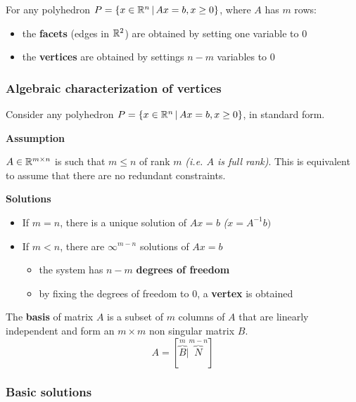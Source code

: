 \documentclass[english]{article}
\begin{document}
\bigskip
\begin{property}
  For any polyhedron \(P = \left\{ x \in \mathbb{R}^n \, | \, Ax = b, x \geq 0 \right\}\), where \(A\) has \(m\) rows:

  \begin{itemize}
    \item the \textbf{facets} (edges in \(\mathbb{R}^2\)) are obtained by setting one variable to \(0\)
    \item the \textbf{vertices} are obtained by settings \(n-m\) variables to \(0\)
  \end{itemize}
\end{property}

\subsubsection{Algebraic characterization of vertices}

Consider any polyhedron \(P = \left\{ x \in \mathbb{R}^n \, | \, Ax = b, x \geq 0 \right\}\), in standard form.

\bigskip
\textbf{Assumption}

\(A \in \mathbb{R}^{m \times n}\) is such that \(m \leq n\) of rank \(m\) \textit{(i.e. \(A\) is full rank)}.
This is equivalent to assume that there are no redundant constraints.

\bigskip
\textbf{Solutions}

\begin{itemize}
  \item If \(m = n\), there is a unique solution of \(Ax = b\) \textit{(\(x = A^{-1} b)\)}
  \item If \(m < n\), there are \(\infty^{m-n}\) solutions of \(Ax = b\)
        \begin{itemize}
          \item the system has \(n-m\) \textbf{degrees of freedom}
          \item by fixing the degrees of freedom to \(0\), a \textbf{vertex} is obtained
        \end{itemize}
\end{itemize}

\bigskip
\begin{definition}
  The \textbf{basis} of matrix \(A\) is a subset of \(m\) columns of \(A\) that are linearly independent and form an \(m \times m\) non singular matrix \(B\).
  \[ A = [ \overbrace{B}^m | \overbrace{N}^{m-n} ] \]
\end{definition}

\subsubsection{Basic solutions}
\label{sec:basic-solutions}
\end{document}
